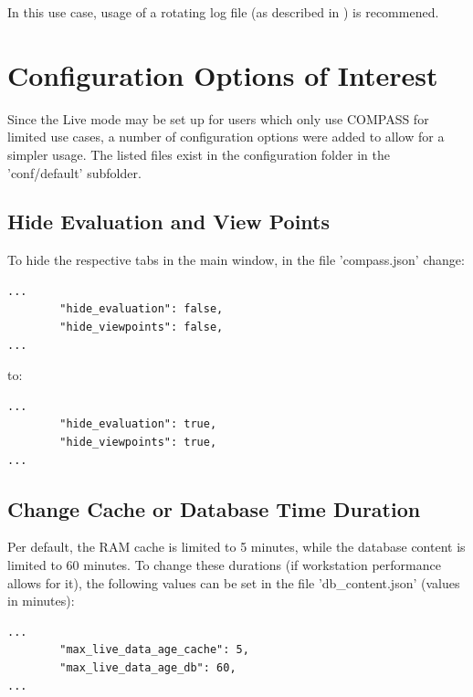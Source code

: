 In this use case, usage of a rotating log file (as described in ) is recommened.

\section{Configuration Options of Interest}

Since the Live mode may be set up for users which only use COMPASS for limited use cases, a number of configuration options were added to allow for a simpler usage. The listed files exist in the configuration folder in the 'conf/default' subfolder.

\subsection{Hide Evaluation and View Points}

To hide the respective tabs in the main window, in the file 'compass.json' change:

\begin{lstlisting}
...
        "hide_evaluation": false,
        "hide_viewpoints": false,
...        
\end{lstlisting}

to:
\begin{lstlisting}
...
        "hide_evaluation": true,
        "hide_viewpoints": true,
...        
\end{lstlisting}

\subsection{Change Cache or Database Time Duration}

Per default, the RAM cache is limited to 5 minutes, while the database content is limited to 60 minutes. To change these durations (if workstation performance allows for it), the following values can be set in the file 'db\_content.json' (values in minutes):

\begin{lstlisting}
...
        "max_live_data_age_cache": 5,
        "max_live_data_age_db": 60,
...        
\end{lstlisting}






